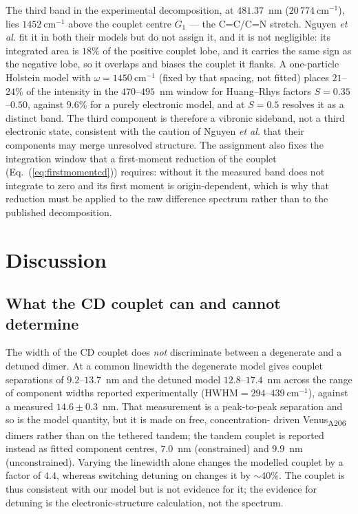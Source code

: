 \documentclass[journal=jpcbfk, manuscript=article, layout=twocolumn, doi=true]{achemso}
\begin{document}
The third band in the experimental decomposition, at $481.37$~nm
($20\,774~\mathrm{cm^{-1}}$), lies $1452~\mathrm{cm^{-1}}$ above the couplet
centre $G_{1}$ --- the C=C/C=N stretch. Nguyen \emph{et al.} fit it in both
their models but do not assign it, and it is not negligible: its integrated
area is $18\%$ of the positive couplet lobe, and it carries the same sign as
the negative lobe, so it overlaps and biases the couplet it flanks. A
one-particle Holstein model with $\omega = 1450~\mathrm{cm^{-1}}$ (fixed by
that spacing, not fitted) places $21$--$24\%$ of the intensity in the
$470$--$495$~nm window for Huang--Rhys factors $S = 0.35$--$0.50$, against
$9.6\%$ for a purely electronic model, and at $S = 0.5$ resolves it as a
distinct band. The third component is therefore a vibronic sideband, not a
third electronic state, consistent with the caution of Nguyen
\emph{et al.}\cite{nguyen2025anomalous} that their components may merge
unresolved structure. The assignment also fixes the integration window that a
first-moment reduction of the couplet (Eq.~(\ref{eq:firstmomentcd})) requires:
without it the measured band does not integrate to zero and its first moment is
origin-dependent, which is why that reduction must be applied to the raw
difference spectrum rather than to the published decomposition.

\section{Discussion}

\subsection{What the CD couplet can and cannot determine}
\label{sec:couplet}

The width of the CD couplet does \emph{not} discriminate between a degenerate
and a detuned dimer. At a common linewidth the degenerate model gives couplet
separations of $9.2$--$13.7$~nm and the detuned model $12.8$--$17.4$~nm across
the range of component widths reported experimentally
($\mathrm{HWHM} = 294$--$439~\mathrm{cm^{-1}}$), against a measured
$14.6\pm0.3$~nm.\cite{kim2019venusa206} That measurement is a peak-to-peak
separation and so is the model quantity, but it is made on free, concentration-
driven Venus\textsubscript{A206} dimers rather than on the tethered tandem; the
tandem couplet is reported instead as fitted component centres, $7.0$~nm
(constrained) and $9.9$~nm (unconstrained).\cite{nguyen2025anomalous} Varying
the linewidth alone changes the modelled couplet by a factor of $4.4$, whereas
switching detuning on changes it by $\sim\!40\%$. The couplet is thus
consistent with our model but is not evidence for it; the evidence for detuning
is the electronic-structure calculation, not the spectrum.
\end{document}
